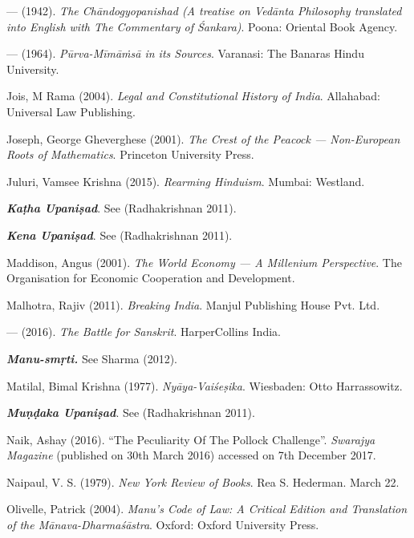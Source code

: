 \begin{thebibliography}{99}
--- (1942). {\sl The Chāndogyopanishad (A treatise on Vedānta Philosophy translated into English with The Commentary of Śankara)}. Poona: Oriental Book Agency.

--- (1964). {\sl Pūrva-Mīmāṁsā in its Sources}. Varanasi: The Banaras Hindu University.

Jois, M Rama (2004). {\sl Legal and Constitutional History of India}. Allahabad: Universal Law Publishing.

Joseph, George Gheverghese (2001). {\sl The Crest of the Peacock --- Non-European Roots of Mathematics}. Princeton University Press.

Juluri, Vamsee Krishna (2015). {\sl Rearming Hinduism}. Mumbai: Westland.

{{\sl\bfseries Kaṭha Upaniṣad}}. See (Radhakrishnan 2011).

{{\sl\bfseries Kena Upaniṣad}}. See (Radhakrishnan 2011).

Maddison, Angus (2001). {\sl The World Economy --- A Millenium Perspective}. The Organisation for Economic Cooperation and Development.

Malhotra, Rajiv (2011). {\sl Breaking India}. Manjul Publishing House Pvt. Ltd.

--- (2016). {\sl The Battle for Sanskrit}. HarperCollins India.

{{\sl\bfseries Manu-smṛti.}} See Sharma (2012).

Matilal, Bimal Krishna (1977). {\sl Nyāya-Vaiśeṣika}. Wiesbaden: Otto Harrassowitz.

{{\sl\bfseries Muṇḍaka Upaniṣad}}. See (Radhakrishnan 2011).

Naik, Ashay (2016). ``The Peculiarity Of The Pollock Challenge''. {\sl Swarajya Magazine} 
(published on 30th March 2016) accessed on 7th December 2017.

Naipaul, V. S. (1979). {\sl New York Review of Books}. Rea S. Hederman. March 22.

Olivelle, Patrick (2004). {\sl Manu’s Code of Law: A Critical Edition and Translation of the Mānava-Dharmaśāstra}. Oxford: Oxford University Press.


\end{thebibliography}
